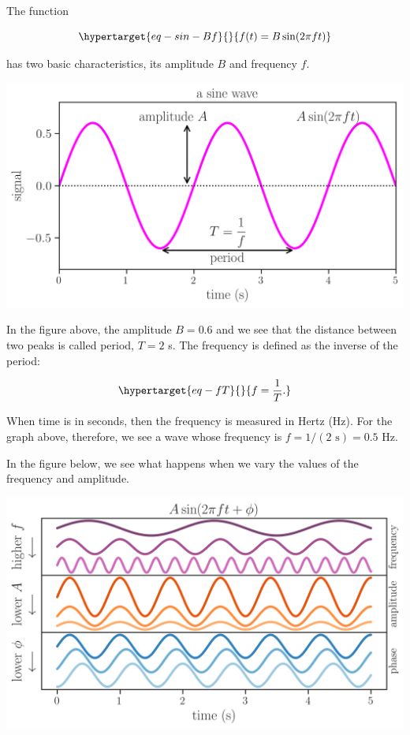 \documentclass[
  letterpaper,
  DIV=11,
  numbers=noendperiod,
  oneside]{scrreprt}
\begin{document}
The function

\begin{equation}\protect\hypertarget{eq-sin-Bf}{}{
f(t) = B\sin(2\pi f t)
}\label{eq-sin-Bf}\end{equation}

has two basic characteristics, its amplitude \(B\) and frequency \(f\).

\includegraphics{frequency/sine1.png}

In the figure above, the amplitude \(B=0.6\) and we see that the
distance between two peaks is called period, \(T=2\) s. The frequency is
defined as the inverse of the period:

\begin{equation}\protect\hypertarget{eq-fT}{}{
f = \frac{1}{T}.
}\label{eq-fT}\end{equation}

When time is in seconds, then the frequency is measured in Hertz (Hz).
For the graph above, therefore, we see a wave whose frequency is
\(f = 1/(2 \text{ s}) = 0.5\) Hz.

In the figure below, we see what happens when we vary the values of the
frequency and amplitude.

\includegraphics{frequency/sine2.png}
\end{document}
